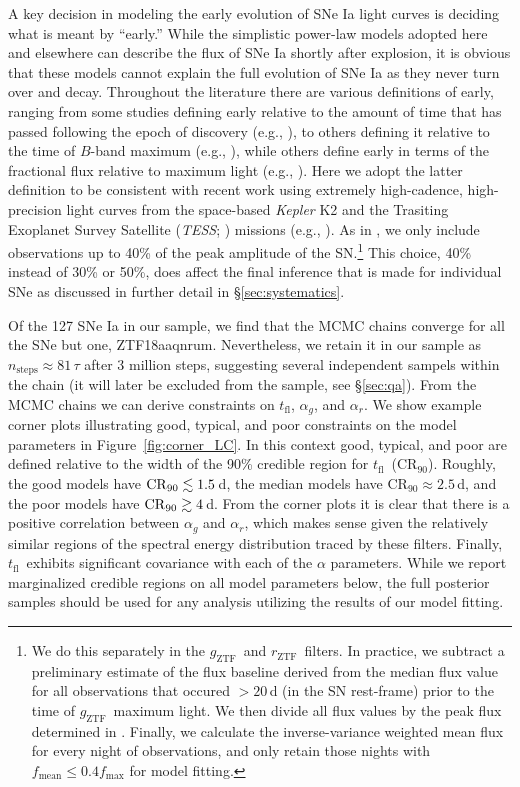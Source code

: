 \documentclass[twocolumn]{./aastex63}
\newcommand{\rztf}{$r_\mathrm{ZTF}$}
\newcommand{\gztf}{$g_\mathrm{ZTF}$}
\newcommand{\tfl}{$t_\mathrm{fl}$}
\begin{document}
A key decision in modeling the early evolution of SNe Ia light curves is
deciding what is meant by ``early.'' While the simplistic power-law models
adopted here and elsewhere can describe the flux of SNe Ia shortly after
explosion, it is obvious that these models cannot explain the full evolution
of SNe Ia as they never turn over and decay. Throughout the literature there
are various definitions of early, ranging from some studies defining early
relative to the amount of time that has passed following the epoch of
discovery (e.g., \citealt{Zheng13,Miller18}), to others defining it relative
to the time of $B$-band maximum (e.g., \citealt{Riess99a,Conley06}), while
others define early in terms of the fractional flux relative to maximum light
(e.g., \citealt{Olling15,Firth15,Fausnaugh19}). Here we adopt the latter
definition to be consistent with recent work using extremely high-cadence,
high-precision light curves from the space-based \textit{Kepler} K2
\citep{Howell14} and the Trasiting Exoplanet Survey Satellite (\textit{TESS};
\citealt{Ricker15}) missions (e.g., \citealt{Olling15,Fausnaugh19}). As in
\citet{Olling15}, we only include observations up to 40\% of the peak
amplitude of the SN.\footnote{We do this separately in the \gztf\ and \rztf\
filters. In practice, we subtract a preliminary estimate of the flux baseline
derived from the median flux value for all observations that occured $>20$\,d
(in the SN rest-frame) prior to the time of \gztf\ maximum light. We then
divide all flux values by the peak flux determined in \citet{Yao19}. Finally,
we calculate the inverse-variance weighted mean flux for every night of
observations, and only retain those nights with $f_\mathrm{mean} \le 0.4
f_\mathrm{max}$ for model fitting.} This choice, 40\% instead of 30\% or
50\%, does affect the final inference that is made for individual SNe as
discussed in further detail in \S\ref{sec:systematics}.

Of the 127 SNe Ia in our sample, we find that the MCMC chains converge for
all the SNe but one, ZTF18aaqnrum. Nevertheless, we retain it in our sample
as $n_\mathrm{steps} \approx 81 \,\tau$ after 3 million steps, suggesting
several independent sampels within the chain (it will later be excluded from
the sample, see \S\ref{sec:qa}). From the MCMC chains we can derive
constraints on \tfl, $\alpha_g$, and $\alpha_r$. We show example corner plots
illustrating good, typical, and poor constraints on the model parameters in
Figure~\ref{fig:corner_LC}. In this context good, typical, and poor are
defined relative to the width of the 90\% credible region for \tfl\
($\mathrm{CR}_{90}$). Roughly, the good models have $\mathrm{CR}_{90} \lesssim
1.5$\,d, the median models have $\mathrm{CR}_{90} \approx 2.5$\,d, and the
poor models have $\mathrm{CR}_{90} \gtrsim 4$\,d. From the corner plots it is
clear that there is a positive correlation between $\alpha_g$ and $\alpha_r$,
which makes sense given the relatively similar regions of the spectral energy
distribution traced by these filters. Finally, \tfl\ exhibits significant
covariance with each of the $\alpha$ parameters. While we report marginalized
credible regions on all model parameters below, the full posterior samples
should be used for any analysis utilizing the results of our model fitting. 
\end{document}
